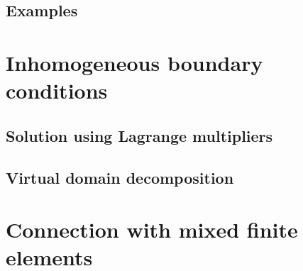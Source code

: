 \subsection{Examples}

\section{Inhomogeneous boundary conditions}\label{sec:mixedbc}

\subsection{Solution using Lagrange multipliers}

\subsection{Virtual domain decomposition}


\section{Connection with mixed finite elements}




